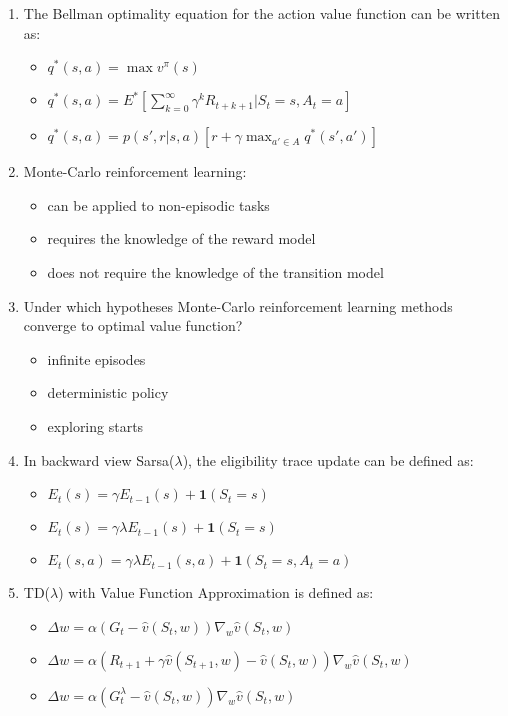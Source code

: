 \documentclass[openany]{book}
\theoremstyle{definition}
\theoremstyle{remark}
\begin{document}
\begin{enumerate}
    \item The Bellman optimality equation for the action value function can be written as:
    \begin{itemize}
        \item[] $q^*(s,a) = \max v^\pi(s)$
        \item[\checkmark] $q^*(s,a) = E^*[\sum_{k=0}^\infty \gamma^k R_{t+k+1}|S_t = s, A_t = a]$
        \item[] $q^*(s,a) = p(s', r|s,a)[r + \gamma \max_{a'\in A} q^*(s',a')]$
    \end{itemize}

    \item Monte-Carlo reinforcement learning:
    \begin{itemize}
        \item[] can be applied to non-episodic tasks
        \item[] requires the knowledge of the reward model
        \item[\checkmark] does not require the knowledge of the transition model
    \end{itemize}

    \item Under which hypotheses Monte-Carlo reinforcement learning methods converge to optimal value function?
    \begin{itemize}
        \item[\checkmark] infinite episodes
        \item[] deterministic policy
        \item[\checkmark] exploring starts
    \end{itemize}

    \item In backward view Sarsa($\lambda$), the eligibility trace update can be defined as:
    \begin{itemize}
        \item[] $E_t(s) = \gamma E_{t-1}(s) + \mathbf{1}(S_t = s)$
        \item[] $E_t(s) = \gamma\lambda E_{t-1}(s) + \mathbf{1}(S_t = s)$
        \item[\checkmark] $E_t(s,a) = \gamma\lambda E_{t-1}(s,a) + \mathbf{1}(S_t = s, A_t = a)$
    \end{itemize}

    \item TD($\lambda$) with Value Function Approximation is defined as:
    \begin{itemize}
        \item[] $\Delta w = \alpha(G_t - \hat{v}(S_t,w))\nabla_w \hat{v}(S_t,w)$
        \item[] $\Delta w = \alpha(R_{t+1} + \gamma\hat{v}(S_{t+1},w) - \hat{v}(S_t,w))\nabla_w \hat{v}(S_t,w)$
        \item[\checkmark] $\Delta w = \alpha(G^\lambda_t - \hat{v}(S_t,w))\nabla_w \hat{v}(S_t,w)$
    \end{itemize}
\end{enumerate}
\end{document}
